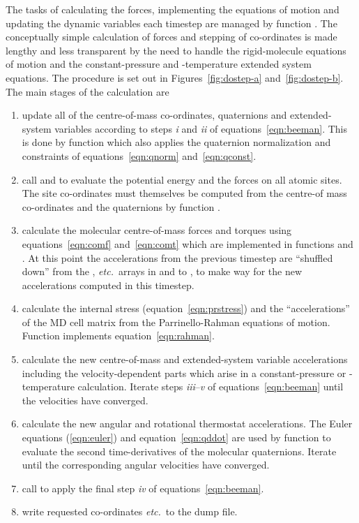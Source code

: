 \documentclass[a4paper,twoside]{report}
\newcommand{\etc}{\emph{etc.}}
\begin{document}
The tasks of calculating the forces, implementing the equations of
motion and updating the dynamic variables each timestep are managed by
function .  The conceptually simple calculation of
forces and stepping of co-ordinates is made lengthy and less
transparent by the need to handle the rigid-molecule equations of
motion and the constant-pressure and -temperature extended system
equations.  The procedure is set out in Figures~\ref{fig:dostep-a}
and~\ref{fig:dostep-b}.  The main stages of the calculation are
\begin{enumerate}
\renewcommand{\theenumi}{\emph{\alph{enumi}}}
\item update all of the centre-of-mass co-ordinates, quaternions and
  extended-system variables according to steps \emph{i} and
  \emph{ii} of equations~\ref{eqn:beeman}. This is done by function
   which also applies the quaternion normalization
  and constraints of equations~\ref{eqn:qnorm} and~\ref{eqn:qconst}.
\item call  and  to
  evaluate the potential energy and the forces on all atomic sites.
  The site co-ordinates must themselves be computed from the centre-of
  mass co-ordinates and the quaternions by function
  . 
\item calculate the molecular centre-of-mass forces and torques using
  equations~\ref{eqn:comf} and~\ref{eqn:comt}  which are implemented
  in functions  and . At
  this point the accelerations from the previous timestep are
  ``shuffled down'' from the ,  \etc\ arrays
  in  and  to ,
   to make way for the new accelerations computed in
  this timestep. 
\item calculate the internal stress (equation~\ref{eqn:prstress}) and
  the ``accelerations'' of the MD cell matrix from the
  Parrinello-Rahman equations of motion. Function 
  implements equation~\ref{eqn:rahman}.
\item calculate the new centre-of-mass and extended-system
  variable accelerations including the velocity-dep\-end\-ent parts
  which arise in a constant-pressure or -temperature calculation.
  Iterate steps \emph{iii}--\emph{v} of equations~\ref{eqn:beeman}
  until the velocities have converged. \label{loop:vel}
\item calculate the new angular and rotational thermostat
  accelerations. The Euler equations (\ref{eqn:euler}) and
  equation~\ref{eqn:qddot} are used by function  to
  evaluate the second time-derivatives of the molecular quaternions.
  Iterate until the corresponding angular velocities have
  converged. \label{loop:quat} 
\item call  to apply the final step \emph{iv} of
  equations~\ref{eqn:beeman}.
\item write requested co-ordinates \etc\ to the dump file.
\end{enumerate}
\end{document}
